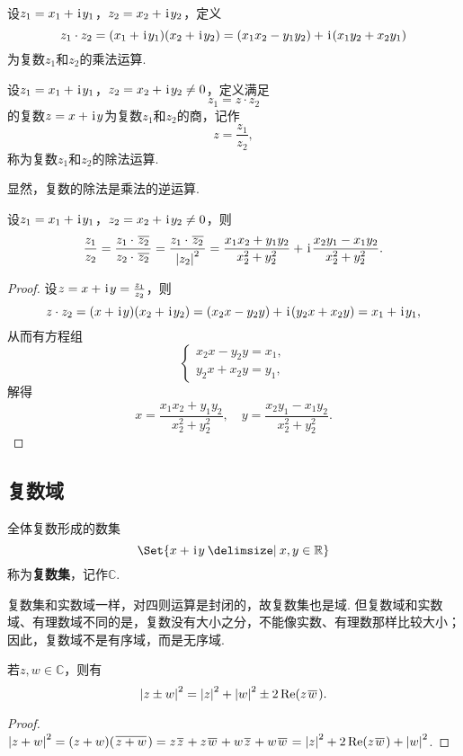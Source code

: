 \begin{definition}[复数乘法]
设\(z_1 = x_1 + \kern1pt\mathrm{i}\kern1pt y_1\)，\(z_2 = x_2 + \kern1pt\mathrm{i}\kern1pt y_2\)，定义\[
z_1 \cdot z_2
= (x_1 + \kern1pt\mathrm{i}\kern1pt y_1)(x_2 + \kern1pt\mathrm{i}\kern1pt y_2)
= (x_1 x_2 - y_1 y_2)+\kern1pt\mathrm{i}\kern1pt(x_1 y_2 + x_2 y_1)
\]为复数\(z_1\)和\(z_2\)的乘法运算.
\end{definition}

\begin{definition}[复数除法]
设\(z_1 = x_1 + \kern1pt\mathrm{i}\kern1pt y_1\)，\(z_2 = x_2 + \kern1pt\mathrm{i}\kern1pt y_2 \neq 0\)，定义满足\[
z_1 = z \cdot z_2
\]的复数\(z = x + \kern1pt\mathrm{i}\kern1pt y\)为复数\(z_1\)和\(z_2\)的商，记作\[
z = \frac{z_1}{z_2},
\]称为复数\(z_1\)和\(z_2\)的除法运算.

显然，复数的除法是乘法的逆运算.
\end{definition}

\begin{theorem}
设\(z_1 = x_1 + \kern1pt\mathrm{i}\kern1pt y_1\)，\(z_2 = x_2 + \kern1pt\mathrm{i}\kern1pt y_2 \neq 0\)，则\[
\frac{z_1}{z_2}
= \frac{z_1 \cdot \kern1pt\overline{z_2}\kern1pt}{z_2 \cdot \kern1pt\overline{z_2}\kern1pt}
= \frac{z_1 \cdot \kern1pt\overline{z_2}\kern1pt}{\abs{z_2}^2}
= \frac{x_1 x_2 + y_1 y_2}{x_2^2 + y_2^2}
+ \kern1pt\mathrm{i}\kern1pt \frac{x_2 y_1 - x_1 y_2}{x_2^2 + y_2^2}.
\]
\begin{proof}
设\(z = x + \kern1pt\mathrm{i}\kern1pt y = \frac{z_1}{z_2}\)，则\[
z \cdot z_2 = (x + \kern1pt\mathrm{i}\kern1pt y)(x_2 + \kern1pt\mathrm{i}\kern1pt y_2)
= (x_2 x - y_2 y) + \kern1pt\mathrm{i}\kern1pt(y_2 x + x_2 y)
= x_1 + \kern1pt\mathrm{i}\kern1pt y_1,
\]从而有方程组\[
\left\{ \begin{array}{l}
x_2 x - y_2 y = x_1, \\
y_2 x + x_2 y = y_1,
\end{array} \right.
\]解得\[
x = \frac{x_1 x_2 + y_1 y_2}{x_2^2 + y_2^2},
\quad
y = \frac{x_2 y_1 - x_1 y_2}{x_2^2 + y_2^2}.
\]
\end{proof}
\end{theorem}

\subsection{复数域}
\begin{definition}
全体复数形成的数集\[
\Set{ x + \iu y \given x,y\in\mathbb{R} }
\]称为\textbf{复数集}，记作\(\mathbb{C}\).
\end{definition}

复数集和实数域一样，对四则运算是封闭的，故复数集也是域.
但复数域和实数域、有理数域不同的是，复数没有大小之分，不能像实数、有理数那样比较大小；
因此，复数域不是有序域，而是无序域.

\begin{theorem}
若\(z,w \in \mathbb{C}\)，则有\begin{equation}
\abs{z \pm w}^2 = \abs{z}^2 + \abs{w}^2 \pm 2 \Re(z \kern1pt\overline{w}\kern1pt).
\end{equation}
\begin{proof}
\(
\abs{z + w}^2
= (z + w) (\kern1pt\overline{z + w}\kern1pt)
= z\kern1pt\overline{z}\kern1pt + z\kern1pt\overline{w}\kern1pt + w\kern1pt\overline{z}\kern1pt + w\kern1pt\overline{w}\kern1pt
= \abs{z}^2 + 2 \Re(z\kern1pt\overline{w}\kern1pt) + \abs{w}^2
\).
\end{proof}
\end{theorem}

